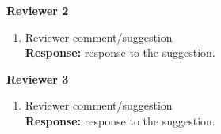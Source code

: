 \documentclass[12pt]{report}
\begin{document}
\newpage
\LARGE
\textbf{Reviewer 2}

\large 


\begin{enumerate}
    \item Reviewer comment/suggestion\\
    \textbf{Response:} response to the suggestion. 


\end{enumerate}

\LARGE
\textbf{Reviewer 3}

\large 

\begin{enumerate}
    \item Reviewer comment/suggestion\\
    \textbf{Response:} response to the suggestion. 


\end{enumerate}

\printbibliography
\end{document}
